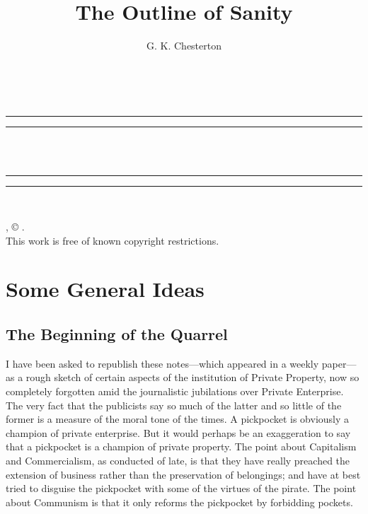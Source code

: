 \documentclass{book}
\date{}
\title{The Outline of Sanity}
\author{G. K. Chesterton}
\begin{document}
\makeatletter
\renewcommand{\@chapapp}{Section}
\makeatother
\renewcommand{\partname}{Chapter}
\thispagestyle{empty}
\begin{center}
	{\Huge \@title   \\[5mm]}
\end{center}
\newpage
\thispagestyle{empty}
\cleardoublepage
\begin{center}
	\thispagestyle{empty}
	\vspace*{\baselineskip}
	\rule{\textwidth}{1.6pt}\vspace*{-\baselineskip}\vspace*{2pt}
	\rule{\textwidth}{0.4pt}\\[\baselineskip]
	{\Huge\scshape \@title   \\[5mm]}
	{\Large }
	\rule{\textwidth}{0.4pt}\vspace*{-\baselineskip}\vspace{3.2pt}
	\rule{\textwidth}{1.6pt}\\[\baselineskip]
	\vspace*{4\baselineskip}
	{\Large \@author}
	\vfill
\end{center}
\pagebreak
\newpage
\thispagestyle{empty}
\null\vfill
\noindent
\begin{center}
	{\emph{\@title}, © \@author.\\[5mm]}
	{This work is free of known copyright restrictions.\\[5mm]}
\end{center}
\pagebreak
\newpage
\setcounter{tocdepth}{0}
\setcounter{secnumdepth}{0}
\setcounter{chapter}{0}

\part{Some General Ideas}
\label{chapter-0}
\chapter{The Beginning of the Quarrel}
\label{chapter-1}
I have been asked to republish these notes—which appeared in a weekly paper—as a rough sketch of certain aspects of the institution of Private Property, now so completely forgotten amid the journalistic jubilations over Private Enterprise. The very fact that the publicists say so much of the latter and so little of the former is a measure of the moral tone of the times. A pickpocket is obviously a champion of private enterprise. But it would perhaps be an exaggeration to say that a pickpocket is a champion of private property. The point about Capitalism and Commercialism, as conducted of late, is that they have really preached the extension of business rather than the preservation of belongings; and have at best tried to disguise the pickpocket with some of the virtues of the pirate. The point about Communism is that it only reforms the pickpocket by forbidding pockets.
\end{document}
